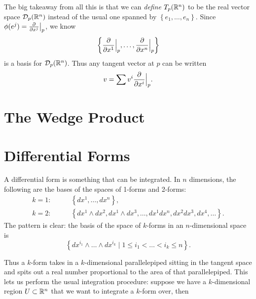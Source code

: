 \documentclass[twoside,10pt]{report}
\begin{document}
\begin{note}[]
	The big takeaway from all this is that we can \emph{define} $T_{p}(\mathbb{R}^{n})$ to be the real vector space $\mathcal{D}_{p}(\mathbb{R}^{n})$ instead of the usual one spanned by $\left\{ e_1, \dots, e_{n} \right\}$. Since $\phi(e^{j}) = \frac{\partial }{\partial x^{j}} \big|_{p}$, we know
\[
\left\{ \frac{\partial }{\partial x^{1}} \Big|_{p}, \dots, \frac{\partial }{\partial x^{n}} \Big|_{p} \right\}
\] is a basis for $\mathcal{D}_{p}(\mathbb{R}^{n})$. Thus any tangent vector at $p$ can be written
\[
	v = \sum v^{i}\frac{\partial }{\partial x^{i}} \Big|_{p}.
\] 
\end{note}

\section{The Wedge Product}



\section{Differential Forms}

A differential form is something that can be integrated. In $n$ dimensions, the following are the bases of the spaces of 1-forms and 2-forms:
\begin{align*}
	k=1: &\qquad \left\{ dx^{1}, \dots, dx^{n} \right\},\\
	k=2: &\qquad \left\{ dx^{1} \wedge dx^{2}, dx^{1} \wedge dx^{3}, \dots, dx^{1}dx^{n}, dx^{2} dx^{3}, dx^{4}, \dots \right\}.
\end{align*}
The pattern is clear: the basis of the space of $k$-forms in an $n$-dimensional space is
\[
\left\{ dx^{i_1} \wedge \dots \wedge dx^{i_k} \;|\; 1 \leq i_1 < \dots < i_k \leq n \right\}.
\] 

Thus a $k$-form takes in a $k$-dimensional parallelepiped sitting in the tangent space and spits out a real number proportional to the area of that parallelepiped. This lets us perform the usual integration procedure: suppose we have a $k$-dimensional region $U \subset \mathbb{R}^{n}$ that we want to integrate a $k$-form over, then
\end{document}
